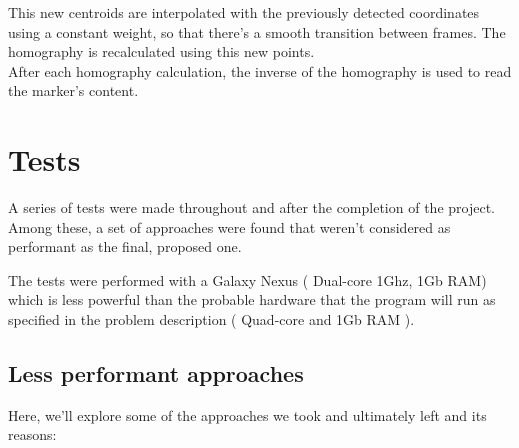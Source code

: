 \documentclass[DIV=calc, paper=a4, fontsize=11pt, twocolumn]{scrartcl}	 %
\begin{document}
This new centroids are interpolated with the previously detected coordinates using a constant weight, so that there's a smooth transition between frames. The homography is recalculated using this new points.\\


After each homography calculation, the inverse of the homography is used to read the marker's content.\\


\section*{Tests}

A series of tests were made throughout and after the completion of the project. Among these, a set of approaches were found that weren't considered as performant as the final, proposed one.

The tests were performed with a Galaxy Nexus ( Dual-core 1Ghz, 1Gb RAM) which is less powerful than the probable hardware that the program will run as specified in the problem description ( Quad-core and 1Gb RAM ).

\subsection*{Less performant approaches}
Here, we'll explore some of the approaches we took and ultimately left and its reasons:
\end{document}
